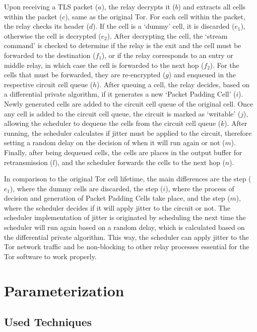 Upon receiving a TLS packet (\(a\)), the relay decrypts it (\(b\)) and extracts all cells within the packet (\(c\)), same as the original Tor. For each cell within the packet, the relay checks its header (\(d\)). If the cell is a `dummy' cell, it is discarded (\(e_1\)), otherwise the cell is decrypted (\(e_2\)). After decrypting the cell, the `stream command' is checked to determine if the relay is the exit and the cell must be forwarded to the destination (\(f_1\)), or if the relay corresponds to an entry or middle relay, in which case the cell is forwarded to the next hop (\(f_2\)). For the cells that must be forwarded, they are re-encrypted (\(g\)) and enqueued in the respective circuit cell queue (\(h\)). After queuing a cell, the relay decides, based on a differential private algorithm, if it generates a new `Packet Padding Cell' (\(i\)). Newly generated cells are added to the circuit cell queue of the original cell. Once any cell is added to the circuit cell queue, the circuit is marked as `writable' (\(j\)), allowing the scheduler to dequeue the cells from the circuit cell queue (\(k\)). After running, the scheduler calculates if jitter must be applied to the circuit, therefore setting a random delay on the decision of when it will run again or not (\(m\)). Finally, after being dequeued cells, the cells are places in the output buffer for retransmission (\(l\)), and the scheduler forwards the cells to the next hop (\(n\)). 

In comparison to the original Tor cell lifetime, the main differences are the step (\(e_1\)), where the dummy cells are discarded, the step (\(i\)), where the process of decision and generation of  Packet Padding Cells take place, and the step (\(m\)), where the scheduler decides if it will apply jitter to the circuit or not. The scheduler implementation of jitter is originated by scheduling the next time the scheduler will run again based on a random delay, which is calculated based on the differential private algorithm. This way, the scheduler can apply jitter to the Tor network traffic and be non-blocking to other relay processes essential for the Tor software to work properly. 

\section{Parameterization}\label{sec:parameterization}

\subsection{Used Techniques}\label{sec:used_techniques}

